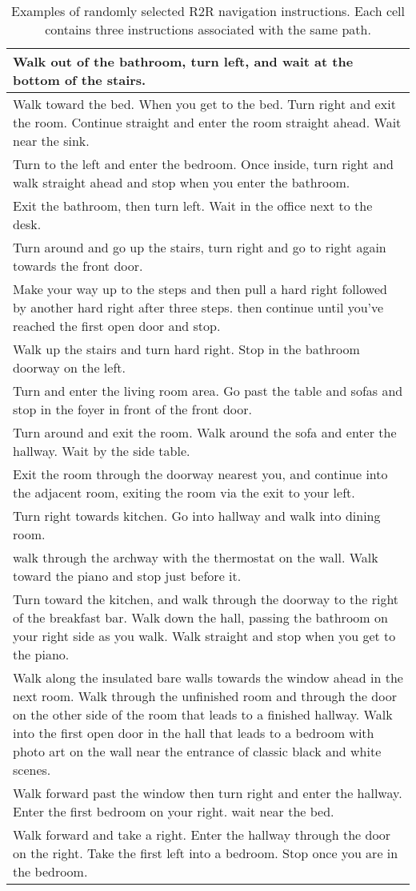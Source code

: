 \documentclass[10pt,twocolumn,letterpaper]{article}
\begin{document}
\begin{table*}[t]
\begin{center}
\begin{tabular}{p{17cm}}
			Walk out of the bathroom, turn left, and wait at the bottom of the stairs. \\
			\midrule
			Walk toward the bed. When you get to the bed. Turn right and exit the room. Continue straight and enter the room straight ahead. Wait near the sink. \\
			Turn to the left and enter the bedroom. Once inside, turn right and walk straight ahead and stop when you enter the bathroom. \\
			Exit the bathroom, then turn left. Wait in the office next to the desk. \\
			\midrule
			Turn around and go up the stairs, turn right and go to right again towards the front door. \\
			Make your way up to the steps and then pull a hard right followed by another hard right after three steps. then continue until you've reached the first open door and stop. \\
			Walk up the stairs and turn hard right. Stop in the bathroom doorway on the left. \\
			\midrule
			Turn and enter the living room area. Go past the table and sofas and stop in the foyer in front of the front door. \\
			Turn around and exit the room. Walk around the sofa and enter the hallway. Wait by the side table. \\
			Exit the room through the doorway nearest you, and continue into the adjacent room, exiting the room via the exit to your left. \\
			\midrule
			Turn right towards kitchen. Go into hallway and walk into dining room. \\
			walk through the archway with the thermostat on the wall.  Walk toward the piano and stop just before it. \\
			Turn toward the kitchen, and walk through the doorway to the right of the breakfast bar.  Walk down the hall, passing the bathroom on your right side as you walk.  Walk straight and stop when you get to the piano. \\
			\midrule
			Walk along the insulated bare walls towards the window ahead in the next room. Walk through the unfinished room and through the door on the other side of the room that leads to a finished hallway. Walk into the first open door in the hall that leads to a bedroom with photo art on the wall near the entrance of classic black and white scenes. \\
			Walk forward past the window then turn right and enter the hallway.  Enter the first bedroom on your right. wait near the bed. \\
			Walk forward and take a right. Enter the hallway through the door on the right. Take the first left into a bedroom. Stop once you are in the bedroom. \\
			\bottomrule
		\end{tabular}
	\end{center}
	\caption{Examples of randomly selected R2R navigation instructions. Each cell contains three instructions associated with the same path. }
	\label{tab:instructions}
\end{table*}
\end{document}
